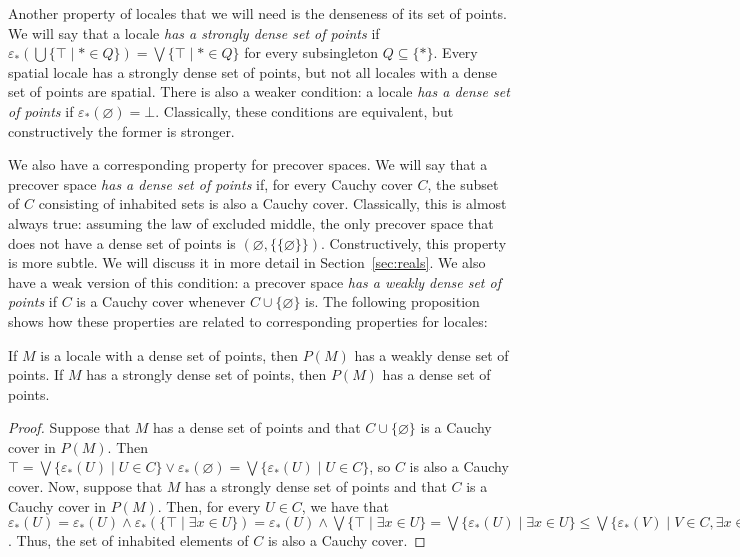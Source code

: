 \documentclass[reqno]{amsart}
\theoremstyle{definition}
\theoremstyle{remark}
\numberwithin{figure}{section}
\begin{document}
Another property of locales that we will need is the denseness of its set of points.
We will say that a locale \emph{has a strongly dense set of points} if $\varepsilon_*(\bigcup \{ \top \mid * \in Q \}) = \bigvee \{ \top \mid * \in Q \}$ for every subsingleton $Q \subseteq \{ * \}$.
Every spatial locale has a strongly dense set of points, but not all locales with a dense set of points are spatial.
There is also a weaker condition: a locale \emph{has a dense set of points} if $\varepsilon_*(\varnothing) = \bot$.
Classically, these conditions are equivalent, but constructively the former is stronger.

We also have a corresponding property for precover spaces.
We will say that a precover space \emph{has a dense set of points} if, for every Cauchy cover $C$, the subset of $C$ consisting of inhabited sets is also a Cauchy cover.
Classically, this is almost always true: assuming the law of excluded middle, the only precover space that does not have a dense set of points is $(\varnothing, \{ \{ \varnothing \} \})$.
Constructively, this property is more subtle.
We will discuss it in more detail in Section~\ref{sec:reals}.
We also have a weak version of this condition: a precover space \emph{has a weakly dense set of points} if $C$ is a Cauchy cover whenever $C \cup \{ \varnothing \}$ is.
The following proposition shows how these properties are related to corresponding properties for locales:

\begin{prop}
If $M$ is a locale with a dense set of points, then $P(M)$ has a weakly dense set of points.
If $M$ has a strongly dense set of points, then $P(M)$ has a dense set of points.
\end{prop}
\begin{proof}
Suppose that $M$ has a dense set of points and that $C \cup \{ \varnothing \}$ is a Cauchy cover in $P(M)$.
Then $\top = \bigvee \{ \varepsilon_*(U) \mid U \in C \} \vee \varepsilon_*(\varnothing) = \bigvee \{ \varepsilon_*(U) \mid U \in C \}$, so $C$ is also a Cauchy cover.
Now, suppose that $M$ has a strongly dense set of points and that $C$ is a Cauchy cover in $P(M)$.
Then, for every $U \in C$, we have that $\varepsilon_*(U) = \varepsilon_*(U) \wedge \varepsilon_*(\{ \top \mid \exists x \in U \}) = \varepsilon_*(U) \wedge \bigvee \{ \top \mid \exists x \in U \} = \bigvee \{ \varepsilon_*(U) \mid \exists x \in U \} \leq \bigvee \{ \varepsilon_*(V) \mid V \in C, \exists x \in V \}$.
Thus, the set of inhabited elements of $C$ is also a Cauchy cover.
\end{proof}
\end{document}
